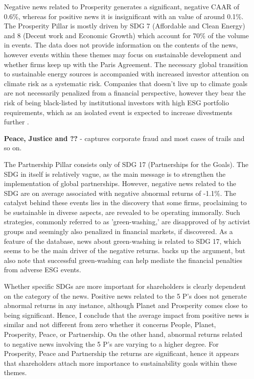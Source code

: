 Negative news related to Prosperity generates a significant, negative CAAR of 0.6\%, whereas for positive news it is insignificant with an value of around 0.1\%. The Prosperity Pillar is mostly driven by SDG 7 (Affordable and Clean Energy) and 8 (Decent work and Economic Growth) which account for 70\% of the volume in events. The data does not provide information on the contents of the news, however events within these themes may focus on sustainable development and whether firms keep up with the Paris Agreement. The necessary global transition to sustainable energy sources is accompanied with increased investor attention on climate risk as a systematic risk. Companies that doesn't live up to climate goals are not necessarily penalized from a financial perspective, however they bear the risk of being black-listed by institutional investors with high ESG portfolio requirements, which as an isolated event is expected to increase divestments further \cite{dell2021norwegian}. 


\textbf{Peace, Justice and ??} - captures corporate fraud and most cases of trails and so on. 


The Partnership Pillar consists only of SDG 17 (Partnerships for the Goals). The SDG in itself is relatively vague, as the main message is to strengthen the implementation of global partnerships. However, negative news related to the SDG are on average associated with negative abnormal returns of -1.1\%. The catalyst behind these events lies in the discovery that some firms, proclaiming to be sustainable in diverse aspects, are revealed to be operating immorally. Such strategies, commonly referred to as 'green-washing,' are disapproved of by activist groups and seemingly also penalized in financial markets, if discovered. As a feature of the database, news about green-washing is related to SDG 17, which seems to be the main driver of the negative returns. \cite{Blancard_ESG_sentiment} backs up the argument, but also note that successful green-washing can help mediate the financial penalties from adverse ESG events.  


Whether specific SDGs are more important for shareholders is clearly dependent on the category of the news. Positive news related to the 5 P's does not generate abnormal returns in any instance, although Planet and Prosperity comes close to being significant. Hence, I conclude that the average impact from positive news is similar and not different from zero whether it concerns People, Planet, Prosperity, Peace, or Partnership. On the other hand, abnormal returns related to negative news involving the 5 P's are varying to a higher degree. For Prosperity, Peace and Partnership the returns are significant, hence it appears that shareholders attach more importance to sustainability goals within these themes.   

